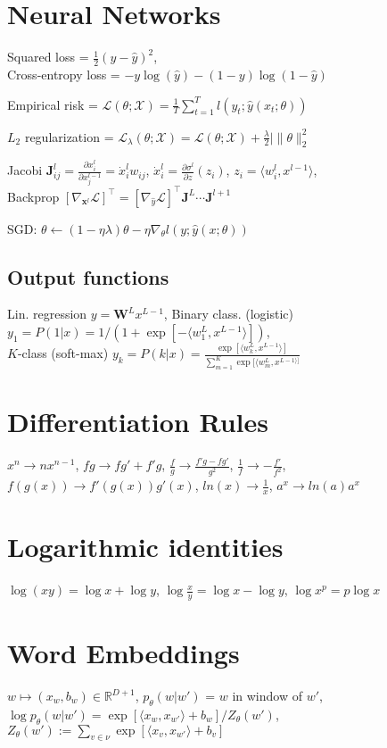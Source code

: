 \documentclass[a4paper, 11pt, landscape]{article}
\begin{document}
\begin{multicols*}{3}
\section{Neural Networks}
Squared loss = $\frac{1}{2}(y-\hat{y})^2$,\\
Cross-entropy loss = $-y\log(\hat{y})-(1-y)\log(1-
\hat{y})$

Empirical risk = $ \mathcal{L}(\theta;\mathcal{X}) = \frac{1}{T}\sum_{t=1}^{T}l(y_t;\hat{y}(x_t;\theta))$

$L_2$ regularization = $\mathcal{L}_\lambda(\theta;\mathcal{X}) = \mathcal{L}(\theta;\mathcal{X})+\frac{\lambda}{2}|\|\theta\|^2_2$

Jacobi $\mathbf{J}^l_{ij}=\frac{\partial x^l_i}{\partial x^{l-1}_j} = \dot{x}^l_iw_{ij}$,
$\dot{x}^l_i = \frac{\partial\sigma^l}{\partial z}(z_i)$,
$z_i = \langle w^l_i,x^{l-1}\rangle$,\\
Backprop $[\nabla_{\mathbf{x}^l}\mathcal{L}]^\top = [\nabla_{\hat{y}}\mathcal{L}]^\top \mathbf{J}^L \cdots \mathbf{J}^{l+1}$

SGD: $\theta \gets (1-\eta\lambda)\theta-\eta\nabla_\theta l(y;\hat{y}(x;\theta))$

\subsection{Output functions}
Lin. regression $y = \mathbf{W}^Lx^{L-1}$,
Binary class. (logistic) $y_1=P(1|x) = 1 / (1+\exp[-\langle w^L_1,x^{L-1}\rangle])$, \\
$K$-class (soft-max) $y_k = P(k|x) = \frac{\exp[\langle w^L_k,x^{L-1} \rangle]}{\sum_{m=1}^{K}\exp[\langle w^L_m,x^{L-1 \rangle]}}$

\section{Differentiation Rules}
$x^n \rightarrow nx^{n-1}$, 
$fg \rightarrow fg'+f'g$,
$\frac{f}{g} \rightarrow \frac{f'g-fg'}{g^2}$,
$\frac{1}{f} \rightarrow -\frac{f'}{f^2}$,
$f(g(x)) \rightarrow f'(g(x))g'(x)$,
$ln(x) \rightarrow \frac{1}{x}$,
$a^x \rightarrow ln(a)a^x$

\section{Logarithmic identities}
$\log(xy) = \log x + \log y$,
$\log\frac{x}{y} = \log x - \log y$,
$\log x^p = p \log x$

\section{Word Embeddings}
$w \mapsto (x_w,b_w) \in \mathbb{R}^{D+1}$,
$p_\theta (w|w')$ = $w$ in window of $w'$,
$\log p_\theta (w|w') = \exp[\langle x_w,x_{w'} \rangle + b_w] / Z_\theta (w')$,\\ $Z_\theta (w') := \sum_{v \in \nu}\exp[ \langle x_v,x_{w'} \rangle + b_v ]$


\end{multicols*}
\end{document}
